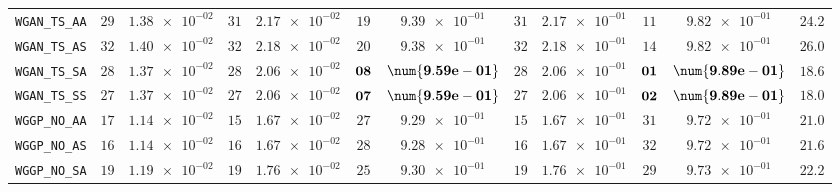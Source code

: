 \begin{xltabular}{\textwidth}{l||cC|cC|cC|cC|cC||c}
	\texttt{WGAN\_TS\_AA} & $ 29$ & $ \num{1.38e-02}$ & $ 31$ & $ \num{2.17e-02}$ & $ 19$ & $ \num{9.39e-01}$ & $ 31$ & $ \num{2.17e-01}$ & $ 11$ & $ \num{9.82e-01}$ & $ 24.2$  \\
	\texttt{WGAN\_TS\_AS} & $ 32$ & $ \num{1.40e-02}$ & $ 32$ & $ \num{2.18e-02}$ & $ 20$ & $ \num{9.38e-01}$ & $ 32$ & $ \num{2.18e-01}$ & $ 14$ & $ \num{9.82e-01}$ & $ 26.0$  \\
	\texttt{WGAN\_TS\_SA} & $ 28$ & $ \num{1.37e-02}$ & $ 28$ & $ \num{2.06e-02}$ & $\bf 08$ & $\bf \num{9.59e-01}$ & $ 28$ & $ \num{2.06e-01}$ & $\bf 01$ & $\bf \num{9.89e-01}$ & $ 18.6$  \\
	\texttt{WGAN\_TS\_SS} & $ 27$ & $ \num{1.37e-02}$ & $ 27$ & $ \num{2.06e-02}$ & $\bf 07$ & $\bf \num{9.59e-01}$ & $ 27$ & $ \num{2.06e-01}$ & $\bf 02$ & $\bf \num{9.89e-01}$ & $ 18.0$  \\ \midrule
	\texttt{WGGP\_NO\_AA} & $ 17$ & $ \num{1.14e-02}$ & $ 15$ & $ \num{1.67e-02}$ & $ 27$ & $ \num{9.29e-01}$ & $ 15$ & $ \num{1.67e-01}$ & $ 31$ & $ \num{9.72e-01}$ & $ 21.0$  \\
	\texttt{WGGP\_NO\_AS} & $ 16$ & $ \num{1.14e-02}$ & $ 16$ & $ \num{1.67e-02}$ & $ 28$ & $ \num{9.28e-01}$ & $ 16$ & $ \num{1.67e-01}$ & $ 32$ & $ \num{9.72e-01}$ & $ 21.6$  \\
	\texttt{WGGP\_NO\_SA} & $ 19$ & $ \num{1.19e-02}$ & $ 19$ & $ \num{1.76e-02}$ & $ 25$ & $ \num{9.30e-01}$ & $ 19$ & $ \num{1.76e-01}$ & $ 29$ & $ \num{9.73e-01}$ & $ 22.2$  \\

\end{xltabular}

